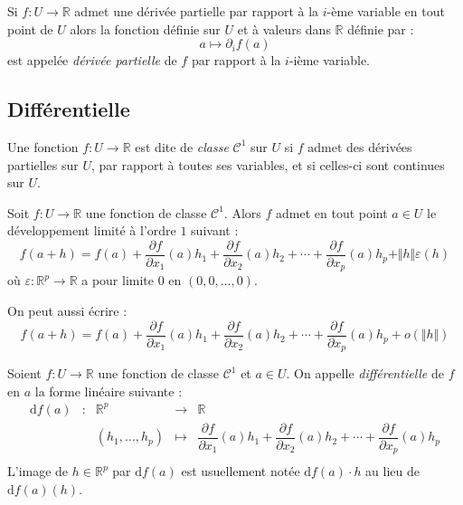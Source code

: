 \documentclass[a4paper,10pt]{report}
\begin{document}
\begin{defin} Si $f : U \rightarrow \mathbb{R}$ admet une dérivée partielle par rapport à la $i$-ème variable en tout point de $U$ alors la fonction définie sur $U$ et à valeurs dans $\mathbb{R}$ définie par :
$$ a \mapsto \partial_i f(a)$$
est appelée \textit{dérivée partielle} de $f$ par rapport à la $i$-ième variable.
\end{defin}

\subsection{Différentielle}

\begin{defin} Une fonction $f : U \rightarrow \mathbb{R}$ est dite de \textit{classe} $\mathcal{C}^1$ sur $U$ si $f$ admet des dérivées partielles sur $U$, par rapport à toutes ses variables, et si celles-ci sont continues sur $U$.
\end{defin}

\begin{thm} Soit $f: U \rightarrow \mathbb{R}$ une fonction de classe $\mathcal{C}^1$. Alors $f$ admet en tout point $a \in U$ le développement limité à l'ordre $1$ suivant :
$$ f(a+h) = f(a) + \dfrac{\partial f}{\partial x_1}(a) h_1 + \dfrac{\partial f}{\partial x_2}(a) h_2 + \cdots + \dfrac{\partial f}{\partial x_p}(a) h_p + \Vert h \Vert \varepsilon(h)$$
où $\varepsilon : \mathbb{R}^p \rightarrow \mathbb{R}$ a pour limite $0$ en $(0, 0, \ldots,0)$.
\end{thm}

\begin{rem} On peut aussi écrire :
$$ f(a+h) = f(a) + \dfrac{\partial f}{\partial x_1}(a) h_1 + \dfrac{\partial f}{\partial x_2}(a) h_2 + \cdots + \dfrac{\partial f}{\partial x_p}(a) h_p + o(\Vert h \Vert)$$
\end{rem}

\begin{defin} Soient $f : U \rightarrow \mathbb{R}$ une fonction de classe $\mathcal{C}^1$ et $a \in U$. On appelle \textit{différentielle} de $f$ en $a$ la forme linéaire suivante :
$$ \begin{array}{cccll}
\textrm{d}f(a) & : & \mathbb{R}^p & \rightarrow & \mathbb{R} \\
& & (h_1, \ldots, h_p) & \mapsto & \dfrac{\partial f}{\partial x_1}(a) h_1 + \dfrac{\partial f}{\partial x_2}(a) h_2 + \cdots + \dfrac{\partial f}{\partial x_p}(a) h_p \\
\end{array}$$
L'image de $h \in \mathbb{R}^p$ par $\textrm{d}f(a)$ est usuellement notée $\textrm{d}f(a) \cdot h$ au lieu de $\textrm{d}f(a)(h)$.
\end{defin}
\end{document}
